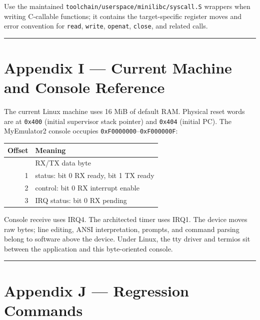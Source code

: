 \documentclass[
  oneside,
  openany]{book}
\begin{document}
Use the maintained \texttt{toolchain/userspace/minilibc/syscall.S}
wrappers when writing C-callable functions; it contains the
target-specific register moves and error convention for \texttt{read},
\texttt{write}, \texttt{openat}, \texttt{close}, and related calls.

\begin{center}\rule{0.5\linewidth}{0.5pt}\end{center}

\hypertarget{appendix-i-current-machine-and-console-reference}{%
\chapter{Appendix I --- Current Machine and Console
Reference}\label{appendix-i-current-machine-and-console-reference}}

The current Linux machine uses 16 MiB of default RAM. Physical reset
words are at \texttt{0x400} (initial supervisor stack pointer) and
\texttt{0x404} (initial PC). The MyEmulator2 console occupies
\texttt{0xF0000000}--\texttt{0xF000000F}:

\begin{longtable}[]{@{}rl@{}}
\toprule\noalign{}
Offset & Meaning \\
\midrule\noalign{}
\endhead
\bottomrule\noalign{}
\endlastfoot
0 & RX/TX data byte \\
1 & status: bit 0 RX ready, bit 1 TX ready \\
2 & control: bit 0 RX interrupt enable \\
3 & IRQ status: bit 0 RX pending \\
\end{longtable}

Console receive uses IRQ4. The architected timer uses IRQ1. The device
moves raw bytes; line editing, ANSI interpretation, prompts, and command
parsing belong to software above the device. Under Linux, the tty driver
and termios sit between the application and this byte-oriented console.

\begin{center}\rule{0.5\linewidth}{0.5pt}\end{center}

\hypertarget{appendix-j-regression-commands}{%
\chapter{Appendix J --- Regression
Commands}\label{appendix-j-regression-commands}}
\end{document}

